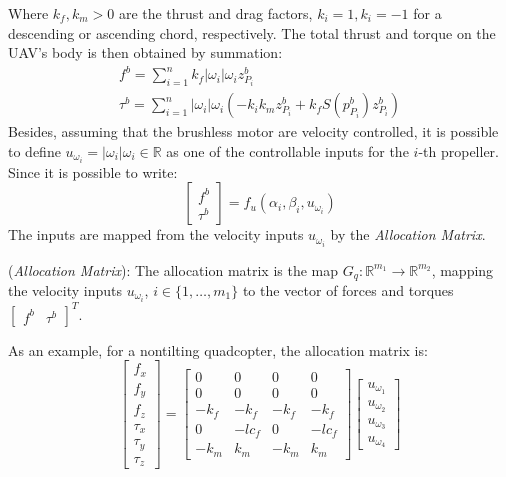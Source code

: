 Where $k_{f},k_{m}>0$ are the thrust and drag factors, $k_i=1,k_i=-1$ for a descending or ascending chord, respectively. The total thrust and torque on the UAV's body is then obtained by summation:
\begin{gather*}
    f^b=\sum_{i=1}^{n}{k_{f}|\omega_i|\omega_iz_{P_i}^b}\\
    \tau^b=\sum_{i=1}^{n}{|\omega_i|\omega_i\left(-k_ik_{m}z_{P_i}^{b}+k_{f}S\left(p_{P_i}^b\right)z_{P_i}^{b}\right)}
\end{gather*}
Besides, assuming that the brushless motor are velocity controlled, it is possible to define $u_{\omega_i}=|\omega_i|\omega_i\in\mathbb{R}$ as one of the controllable inputs for the $i$-th propeller. Since it is possible to write:
\begin{equation*}
    \begin{bmatrix}
        f^b \\ \tau^b
    \end{bmatrix}=f_u(\alpha_i,\beta_i,u_{\omega_i})
\end{equation*}
The inputs are mapped from the velocity inputs $u_{\omega_i}$ by the \textit{Allocation Matrix}.
\begin{definition}\label{Allocation_Matrix}
    (\textit{Allocation Matrix}): The allocation matrix is the map $G_q:\mathbb{R}^{m_1}\rightarrow\mathbb{R}^{m_2}$, mapping the velocity inputs $u_{\omega_i}$, $i\in\{1,\dots,m_1\}$ to the vector of forces and torques $\begin{bmatrix}f^b & \tau^b\end{bmatrix}^{T}$.
\end{definition}
As an example, for a nontilting quadcopter, the allocation matrix is:
\begin{equation*}
    \begin{bmatrix}
        f_x \\ f_y \\ f_z \\ \tau_x \\ \tau_y \\ \tau_z
    \end{bmatrix}=
    \begin{bmatrix}
        0 & 0 & 0 & 0\\
        0 & 0 & 0 & 0\\
        -k_{f} & -k_{f} & -k_{f} & -k_{f}\\
        0 & -lc_f & 0 & -lc_f\\
        -k_{m} & k_{m} & -k_{m} & k_{m}
    \end{bmatrix}
    \begin{bmatrix}
        u_{\omega_1} \\ u_{\omega_2} \\ u_{\omega_3} \\ u_{\omega_4}
    \end{bmatrix}
\end{equation*}

